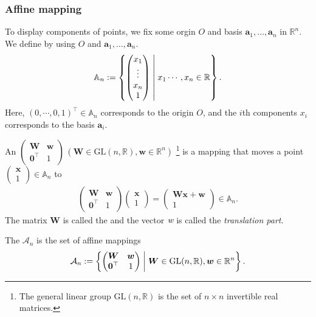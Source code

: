 \subsubsection{Affine mapping}

To display components of points, we fix some orgin $O$ and basis $\bm{a}_{1}, \dots, \bm{a}_{n}$ in $\mathbb{R}^{n}$.
We define  by using $O$ and $\bm{a}_{1}, \dots, \bm{a}_{n}$.
\begin{align}
  \mathbb{A}_{n} := \left\{  \begin{pmatrix} x_{1} \\ \vdots \\ x_{n} \\ 1 \end{pmatrix}  \mathrel{}\middle|\mathrel{}  x_{1} \cdots, x_{n} \in \mathbb{R}  \right\}.
\end{align}
Here, $(0, \cdots, 0, 1)^{\top} \in \mathbb{A}_{n}$ corresponds to the origin $O$, and the $i$th components $x_{i}$ corresponds to the basis $\bm{a}_{i}$.

\begin{screen}
  \begin{definition}
    An  $\begin{pmatrix} \bm{W} & \bm{w} \\ \bm{0}^{\top} & 1 \end{pmatrix} \,( \bm{W} \in \mathrm{GL}(n, \mathbb{R}), \bm{w} \in \mathbb{R}^{n} ) $ \footnote{The general linear group $\mathrm{GL}(n, \mathbb{R})$ is the set of $n \times n$ invertible real matrices.} is a mapping that moves a point $ \begin{pmatrix} \bm{x} \\ 1 \end{pmatrix} \in \mathbb{A}_{n}$ to
      \begin{align}
        \begin{pmatrix} \bm{W} & \bm{w} \\ \bm{0}^{\top} & 1 \end{pmatrix} \begin{pmatrix} \bm{x} \\ 1 \end{pmatrix}
          = \begin{pmatrix} \bm{Wx} + \bm{w} \\ 1 \end{pmatrix} \in \mathbb{A}_{n}.
      \end{align}
    The matrix $\bm{W}$ is called the  and the vector $\textit{w}$ is called the \textit{translation part}.

    The  $\mathcal{A}_{n}$ is the set of affine mappings
    \begin{align}
      \mathcal{A}_{n} := \left\{  \begin{pmatrix} \bm{W} & \bm{w} \\ \bm{0}^{\top} & 1 \end{pmatrix}  \mathrel{}\middle|\mathrel{}  \bm{W} \in \mathrm{GL}(n, \mathbb{R}), \bm{w} \in \mathbb{R}^{n}  \right\}.
    \end{align}
  \end{definition}
\end{screen}

